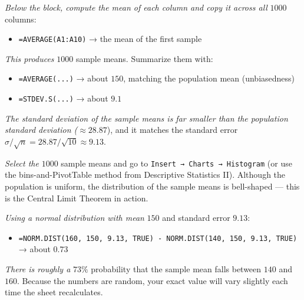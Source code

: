 \documentclass[
  11pt,
  letterpaper,
  DIV=11,
  numbers=noendperiod,
  oneside,
  open=any]{scrreprt}
\providecommand{\tightlist}{%
  \setlength{\itemsep}{0pt}\setlength{\parskip}{0pt}}\usepackage{longtable,booktabs,array}
\newenvironment{bsanswerkey}[2]{%
  \begin{tcolorbox}[bsbase, colback=bspaper2, colframe=bsline, fontupper=\small,
    title={\hypertarget{a-#1}{}\label{a-#1}\hyperlink{q-#1}{\textcolor{bsink2}{\MakeUppercase{#2}}}\hfill
      \hyperlink{q-#1}{\textcolor{bsaccent}{\normalfont\footnotesize back to page \pageref{q-#1}}}}]}%
  {\end{tcolorbox}}
\begin{document}
\begin{bsanswerkey}{bsans105}{Exercise 1, question 2}

\emph{Below the block, compute the mean of each column and copy it
across all} \(1000\) columns:

\begin{itemize}
\tightlist
\item
  \texttt{=AVERAGE(A1:A10)} → the mean of the first sample
\end{itemize}

\emph{This produces} \(1000\) sample means. Summarize them with:

\begin{itemize}
\tightlist
\item
  \texttt{=AVERAGE(...)} → about \(150\), matching the population mean
  (unbiasedness)
\item
  \texttt{=STDEV.S(...)} → about \(9.1\)
\end{itemize}

\emph{The standard deviation of the sample means is far smaller than the
population standard deviation (}\(\approx 28.87\)), and it matches the
standard error \(\sigma / \sqrt{n} = 28.87 / \sqrt{10} \approx 9.13\).

\end{bsanswerkey}

\begin{bsanswerkey}{bsans106}{Exercise 1, question 3}

\emph{Select the} \(1000\) sample means and go to
\texttt{Insert\ →\ Charts\ →\ Histogram} (or use the bins-and-PivotTable
method from Descriptive Statistics II). Although the population is
uniform, the distribution of the sample means is bell-shaped --- this is
the Central Limit Theorem in action.

\emph{Using a normal distribution with mean} \(150\) and standard error
\(9.13\):

\begin{itemize}
\tightlist
\item
  \texttt{=NORM.DIST(160,\ 150,\ 9.13,\ TRUE)\ -\ NORM.DIST(140,\ 150,\ 9.13,\ TRUE)}
  → about \(0.73\)
\end{itemize}

\emph{There is roughly a} \(73\%\) probability that the sample mean
falls between \(140\) and \(160\). Because the numbers are random, your
exact value will vary slightly each time the sheet recalculates.

\end{bsanswerkey}
\end{document}
